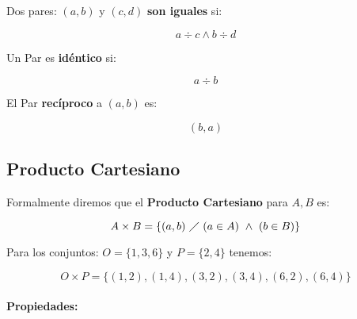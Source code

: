  Dos pares: $(a,b)$ y $(c,d)$ \textbf{son iguales} si:

\begin{equation}
a \div c \wedge b \div d
\end{equation}

 Un Par es \textbf{idéntico} si:

\begin{equation}
a \div b
\end{equation}

 El Par \textbf{recíproco} a $(a,b)$ es:

\begin{equation}
(b,a)
\end{equation}

\subsection{Producto Cartesiano}

 Formalmente diremos que el \textbf{Producto Cartesiano} para $A,B$ es:

\begin{equation}
A \times B = \{(a,b)\ \diagup\ (a \in A)\ \wedge\ (b \in B)\}
\end{equation}

\ejem Para los conjuntos: $O=\{1,3,6\}$ y $P=\{2,4\}$ tenemos:\label{ejemOxP}

\begin{equation}
O \times P = \{(1,2),(1,4),(3,2),(3,4),(6,2),(6,4)\}
\end{equation}

\paragraph*{Propiedades:}

